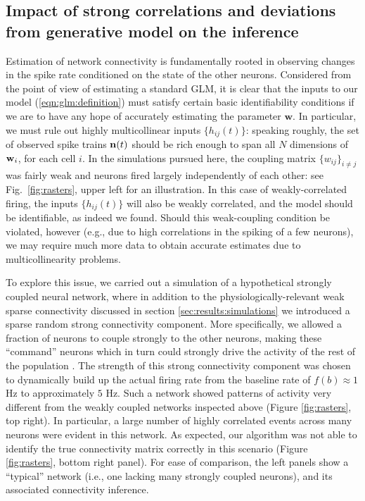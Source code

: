 \documentclass[aoas,preprint]{imsart}
\newcommand{\w}{w}
\newcommand{\bw}{\mathbf{\w}}
\begin{document}
\subsection{Impact of strong correlations and deviations from
  generative model on the inference} 

Estimation of network connectivity is fundamentally rooted in
observing changes in the spike rate conditioned on the state of the
other neurons.  Considered from the point of view of estimating a
standard GLM, it is clear that the inputs to our model
(\ref{eqn:glm:definition}) must satisfy certain basic identifiability
conditions if we are to have any hope of accurately estimating the
parameter $\bw$.  In particular, we must rule out highly
multicollinear inputs $\{h_{ij}(t)\}$: speaking roughly, the set of
observed spike trains ${\bf n}(t)$ should be rich enough to span all
$N$ dimensions of ${\bf w}_i$, for each cell $i$.  In the simulations
pursued here, the coupling matrix $\{w_{ij}\}_{i \neq j}$ was fairly
weak and neurons fired largely independently of each other: see
Fig.~\ref{fig:rasters}, upper left for an illustration.  In this case
of weakly-correlated firing, the inputs $\{h_{ij}(t)\}$ will also be
weakly correlated, and the model should be identifiable, as indeed we
found.  Should this weak-coupling condition be violated, however
(e.g., due to high correlations in the spiking of a few neurons), we
may require much more data to obtain accurate estimates due to
multicollinearity problems.

To explore this issue, we carried out a simulation of a hypothetical
strongly coupled neural network, where in addition to the
physiologically-relevant weak sparse connectivity discussed in section
\ref{sec:results:simulations} we introduced a sparse random strong
connectivity component.  More specifically, we allowed a fraction of
neurons to couple strongly to the other neurons, making these
``command'' neurons which in turn could strongly drive the activity of
the rest of the population \cite{MACLEAN05}.  The strength of this
strong connectivity component was chosen to dynamically build up the
actual firing rate from the baseline rate of $f(b) \approx 1$ Hz to
approximately $5$ Hz. Such a network showed patterns of activity very
different from the weakly coupled networks inspected above (Figure
\ref{fig:rasters}, top right). In particular, a large number of highly
correlated events across many neurons were evident in this network. As
expected, our algorithm was not able to identify the true connectivity
matrix correctly in this scenario (Figure \ref{fig:rasters}, bottom
right panel).  For ease of comparison, the left panels show a
``typical'' network (i.e., one lacking many strongly coupled neurons),
and its associated connectivity inference.
\end{document}
